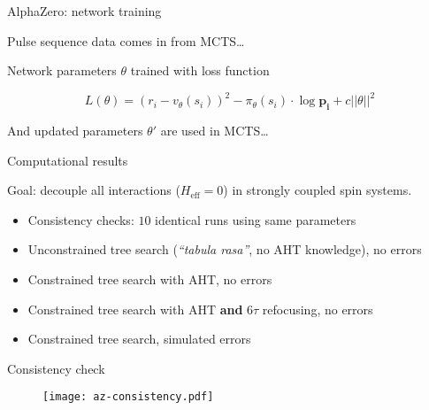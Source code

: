 \documentclass{beamer}
\begin{document}
\begin{frame}{AlphaZero: network training}

Pulse sequence data comes in from MCTS\dots

    \begin{figure}
    \centering
    \scalebox{.6}{
    
    }
    \end{figure}

Network parameters $\theta$ trained with loss function

\[
    L(\theta) = (r_i - v_\theta(s_i))^2 - \pi_\theta(s_i) \cdot \log \mathbf{p_i} + c ||\theta||^2
\]

And updated parameters $\theta'$ are used in MCTS\dots

\end{frame}



\begin{frame}{Computational results}


Goal: decouple all interactions ($H_{\text{eff}} = 0$) in strongly coupled spin systems.

\begin{itemize}
    \item Consistency checks: $10$ identical runs using same parameters
    \item Unconstrained tree search (\emph{``tabula rasa''}, no AHT knowledge), no errors
    \item Constrained tree search with AHT, no errors
    \item Constrained tree search with AHT \textbf{and} $6\tau$ refocusing, no errors
    \item Constrained tree search, simulated errors
\end{itemize}

\note{

}

\end{frame}



\begin{frame}{Consistency check}

\begin{figure}
\centering
\texttt{[image: az-consistency.pdf]}
\end{figure}


\end{frame}
\end{document}
